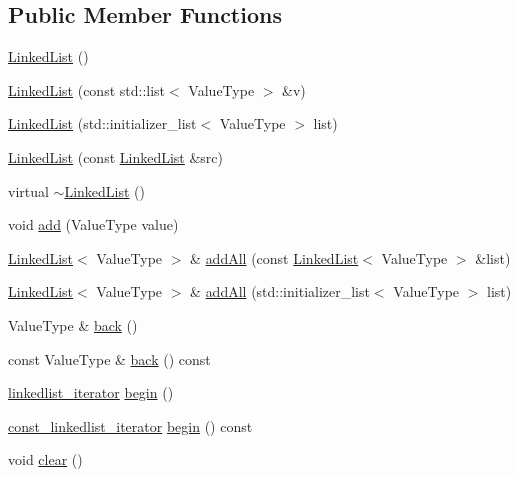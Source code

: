 \subsection*{Public Member Functions}
\begin{DoxyCompactItemize}
\item 
\mbox{\hyperlink{classLinkedList_ac5d84c6fdafb5582dca61b2bbb7800f0}{Linked\+List}} ()
\item 
\mbox{\hyperlink{classLinkedList_ae9514892204b457ddde51967b066e772}{Linked\+List}} (const std\+::list$<$ Value\+Type $>$ \&v)
\item 
\mbox{\hyperlink{classLinkedList_ad6d043fd9b28b5547bfdded20547e07b}{Linked\+List}} (std\+::initializer\+\_\+list$<$ Value\+Type $>$ list)
\item 
\mbox{\hyperlink{classLinkedList_a1330add0e884cda7ab733040dc48c7ff}{Linked\+List}} (const \mbox{\hyperlink{classLinkedList}{Linked\+List}} \&src)
\item 
virtual \mbox{\hyperlink{classLinkedList_ab2cd0a10d50aeffd524b75b36fb2be05}{$\sim$\+Linked\+List}} ()
\item 
void \mbox{\hyperlink{classLinkedList_aa6249e9d60956ac91381e5040b77c0c6}{add}} (Value\+Type value)
\item 
\mbox{\hyperlink{classLinkedList}{Linked\+List}}$<$ Value\+Type $>$ \& \mbox{\hyperlink{classLinkedList_a1c99533be0fd8af3d62d3cc41b2ff1cb}{add\+All}} (const \mbox{\hyperlink{classLinkedList}{Linked\+List}}$<$ Value\+Type $>$ \&list)
\item 
\mbox{\hyperlink{classLinkedList}{Linked\+List}}$<$ Value\+Type $>$ \& \mbox{\hyperlink{classLinkedList_ae5de21c6c9261adbe14860d81fa7c984}{add\+All}} (std\+::initializer\+\_\+list$<$ Value\+Type $>$ list)
\item 
Value\+Type \& \mbox{\hyperlink{classLinkedList_a2bad145b40a82c36986f67610313658d}{back}} ()
\item 
const Value\+Type \& \mbox{\hyperlink{classLinkedList_adc761c91bdacd01bed5c96e25fd9486a}{back}} () const
\item 
\mbox{\hyperlink{classLinkedList_1_1linkedlist__iterator}{linkedlist\+\_\+iterator}} \mbox{\hyperlink{classLinkedList_aadd186cc545efe8cf699b4ec5e6402ae}{begin}} ()
\item 
\mbox{\hyperlink{classLinkedList_1_1const__linkedlist__iterator}{const\+\_\+linkedlist\+\_\+iterator}} \mbox{\hyperlink{classLinkedList_af9ba13847c300fab2067d7a228449947}{begin}} () const
\item 
void \mbox{\hyperlink{classLinkedList_ac8bb3912a3ce86b15842e79d0b421204}{clear}} ()

\end{DoxyCompactItemize}
